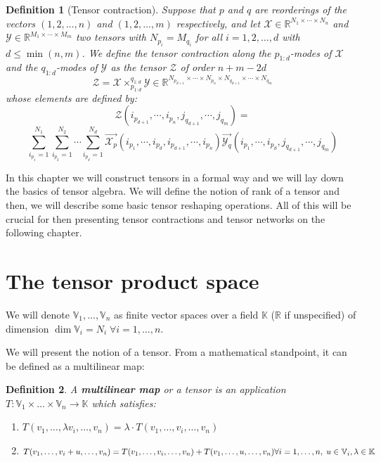 \documentclass[11pt,a4paper,openright,oneside]{book}
\numberwithin{equation}{section}
\newtheorem{defn0}{Definition}[chapter]
\newenvironment{definition}{ \begin{defn0}}{\end{defn0}}
\begin{document}
\begin{definition}[Tensor contraction]
     Suppose that $p$ and $q$ are reorderings of the vectors
    $(1,2,\dots,n)$ and $(1,2,\dots,m)$ respectively, and let ${\mathcal{X} \in \mathbb{R}^{N_1 \times \cdots \times N_n}}$ 
    and $\mathcal{Y} \in \mathbb{R}^{M_1 \times \cdots \times M_m}$ two tensors with $N_{p_i} = M_{q_i}$ for all $i = 1,2,\dots,d$
    with $d \leqslant \min{(n, m)}$. We define the tensor contraction along the $p_{1:d}$-modes of $\mathcal{X}$ and the $q_{1:d}$-modes
    of $\mathcal{Y}$ as the tensor $\mathcal{Z}$ of order $n + m - 2d$
$$\mathcal{Z} = \mathcal{X} \times_{p_{1:d}}^{q_{1:d}} \mathcal{Y} \in \mathbb{R}^{N_{p_{d+1}} \times \cdots \times N_{p_{n}} \times N_{q_{d+1}} \times \cdots \times N_{q_m}}$$
whose elements are defined by:
$$\mathcal{Z}(i_{p_{d+1}}, \cdots, i_{p_n}, j_{q_{d+1}}, \cdots, j_{q_m}) = $$$$ \sum_{i_{p_1} = 1}^{N_1} \sum_{i_{p_2} = 1}^{N_2} \cdots \sum_{i_{p_d} = 1}^{N_d}
\overrightarrow{\mathcal{X}_p}(i_{p_1}, \cdots, i_{p_d}, i_{p_{d+1}}, \cdots, i_{p_n}) \overrightarrow{\mathcal{Y}_q}(i_{p_1}, \cdots, i_{p_d}, j_{q_{d+1}}, \cdots, j_{q_m})$$
\end{definition}



\fi


In this chapter we will construct tensors in a formal way and we will lay down the basics of tensor algebra. We will
define the notion of rank of a tensor and then,
we will describe some basic tensor reshaping operations.
All of this will be crucial for then presenting tensor contractions and tensor networks on the following chapter.

\section{The tensor product space}

We will denote $\mathbb{V}_1, \dots, \mathbb{V}_n$ as finite vector spaces over a field $\mathbb{K}$ ($\mathbb{R}$ if unspecified) of dimension $\dim{\mathbb{V}_i} = N_i \; \forall i = 1, \dots, n$.

We will present the notion of a tensor. From a mathematical standpoint, it can be defined as a multilinear map:

\begin{definition}
    A \textbf{multilinear map} or a tensor is an application ${T: \mathbb{V}_1 \times \dots \times \mathbb{V}_n \rightarrow \mathbb{K}}$ which satisfies:
    \begin{enumerate}
        \item $T(v_1, \dots, \lambda v_i, \dots, v_n) = \lambda \cdot T(v_1, \dots, v_i, \dots, v_n)$
        \item $T(v_1, \dots, v_i + u, \dots, v_n) = T(v_1, \dots, v_i, \dots, v_n) + T(v_1, \dots, u, \dots, v_n) \\ {\forall i = 1, \dots, n, \; u \in \mathbb{V}_i, \lambda \in \mathbb{K}}$
    \end{enumerate}
\end{definition}
\end{document}

